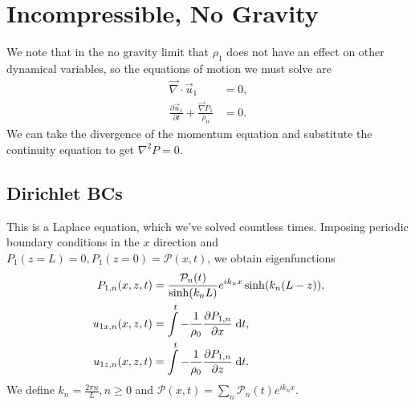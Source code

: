 \documentclass[11pt,
        usenames, %
        dvipsnames %
    ]{report}
\newcommand*{\pd}[2]{\frac{\partial#1}{\partial#2}}
\DeclarePairedDelimiter\p{\lparen}{\rparen}
\begin{document}
\section{Incompressible, No Gravity}

We note that in the no gravity limit that $\rho_1$ does not have an effect on
other dynamical variables, so the equations of motion we must solve are
\begin{equation}
    \begin{split}
        \vec{\nabla} \cdot \vec{u}_1 &= 0,\\
        \pd{\vec{u}_1}{t} + \frac{\vec{\nabla}P_1}{\rho_0} &= 0.
    \end{split}\label{eq:lin.no_g_eom}
\end{equation}
We can take the divergence of the momentum equation and substitute the
continuity equation to get $\nabla^2 P = 0$.

\subsection{Dirichlet BCs}

This is a Laplace equation, which we've solved countless times. Imposing
periodic boundary conditions in the $x$ direction and $P_1(z = L) = 0, P_1(z =
0) = \mathcal{P}(x, t)$, we obtain eigenfunctions
\begin{equation}
    \begin{split}
        P_{1, n}(x, z, t) &=
            \frac{\mathcal{P}_n(t)}{\sinh(k_nL)}e^{ik_nx}\sinh\p*{k_n(L - z)},\\
        u_{1x, n}(x, z, t) &=
            \int\limits^t -\frac{1}{\rho_0}\pd{P_{1, n}}{x}\;\mathrm{d}t,\\
        u_{1z, n}(x, z, t) &=
            \int\limits^t -\frac{1}{\rho_0}\pd{P_{1, n}}{z}\;\mathrm{d}t.
    \end{split}\label{eq:incomp_nog}
\end{equation}
We define $k_n = \frac{2\pi n}{L}, n \geq 0$ and $\mathcal{P}(x, t) =
\sum\limits_n \mathcal{P}_n(t)e^{ik_nx}$.
\end{document}
